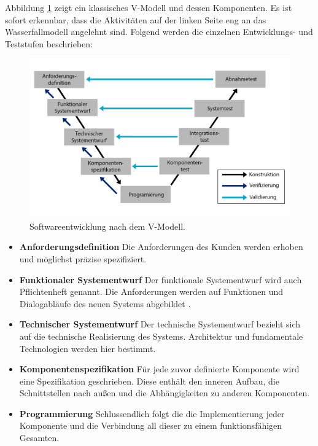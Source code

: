 Abbildung \ref{fig:v_modell} zeigt ein klassisches V-Modell und dessen Komponenten. Es ist sofort erkennbar, dass die Aktivitäten auf der linken Seite eng an das Wasserfallmodell \cite{grechenig_softwaretechnik:_2010} angelehnt sind. Folgend werden die einzelnen Entwicklungs- und Teststufen beschrieben:

\begin{figure}[h] 
  \centering
     \includegraphics[width=1\textwidth]{figures/v_modell.png}
  \caption{Softwareentwicklung nach dem V-Modell.}
  \label{fig:v_modell}
\end{figure}



\begin{itemize}
\item \textbf{Anforderungsdefinition} Die Anforderungen des Kunden werden erhoben und möglichst präzise spezifiziert.
\item \textbf{Funktionaler Systementwurf} Der funktionale Systementwurf wird auch Pflichtenheft genannt. Die Anforderungen werden auf Funktionen und Dialogabläufe des neuen Systems abgebildet \cite{spillner_basiswissen_2012}.
\item \textbf{Technischer Systementwurf} Der technische Systementwurf bezieht sich auf die technische Realisierung des Systems. Architektur und fundamentale Technologien werden hier bestimmt.
\item \textbf{Komponentenspezifikation} Für jede zuvor definierte Komponente wird eine Spezifikation geschrieben. Diese enthält den inneren Aufbau, die Schnittstellen nach außen und die Abhängigkeiten zu anderen Komponenten.
\item \textbf{Programmierung} Schlussendlich folgt die die Implementierung jeder Komponente und die Verbindung all dieser zu einem funktionsfähigen Gesamten.
\end{itemize}

